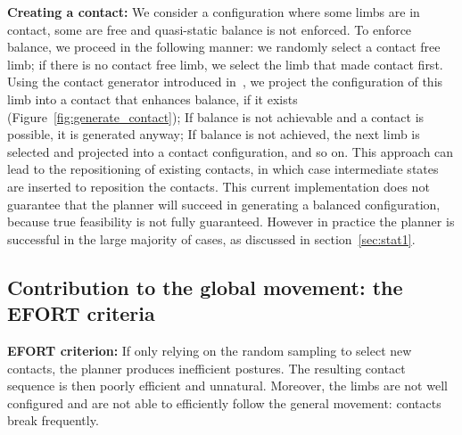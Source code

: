 \medskip\noindent\textbf{Creating a contact:} We consider a configuration where some limbs are in contact, some are free and quasi-static balance is not enforced. To enforce balance, we proceed in the following 
manner:
we randomly select a contact free limb; if there is no contact free limb, we select
the limb that made contact first.
Using the contact generator introduced in~\cite{Tonneau2014}, we project the configuration of this limb into a contact that enhances balance, if it exists (Figure~\ref{fig:generate_contact}); If balance is not achievable and a contact is possible, it is generated anyway;
If balance is not achieved, the next limb is selected and projected into a contact configuration, and so on.
This approach can lead to the repositioning of existing contacts, in which case intermediate states are inserted to reposition the contacts.
This current implementation does not guarantee that the planner will succeed in generating a balanced configuration, because
true feasibility is not fully guaranteed.
However in practice the planner is successful in the large majority of cases, as discussed in section~\ref{sec:stat1}.

\subsection{Contribution to the global movement: the EFORT criteria}
\noindent\textbf{EFORT criterion:} If only relying on the random sampling to select new contacts, the planner produces inefficient postures. The resulting contact sequence is then poorly efficient and unnatural. Moreover, the limbs are not well configured and are not able to efficiently follow the general movement: contacts break frequently.

